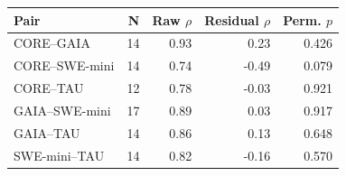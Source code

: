 \begin{tabular}{lrrrr}
\toprule
Pair & N & Raw $\rho$ & Residual $\rho$ & Perm. $p$ \\
\midrule
CORE--GAIA & 14 & 0.93 & 0.23 & 0.426 \\
CORE--SWE-mini & 14 & 0.74 & -0.49 & 0.079 \\
CORE--TAU & 12 & 0.78 & -0.03 & 0.921 \\
GAIA--SWE-mini & 17 & 0.89 & 0.03 & 0.917 \\
GAIA--TAU & 14 & 0.86 & 0.13 & 0.648 \\
SWE-mini--TAU & 14 & 0.82 & -0.16 & 0.570 \\
\bottomrule
\end{tabular}

